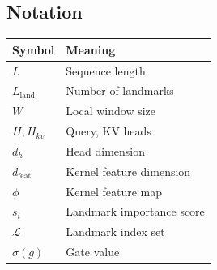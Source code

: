 \subsection{Notation}

\begin{table}[H]
\centering
\small
\begin{tabular}{ll}
\toprule
\textbf{Symbol} & \textbf{Meaning} \\
\midrule
$L$ & Sequence length \\
$L_\text{land}$ & Number of landmarks \\
$W$ & Local window size \\
$H, H_{kv}$ & Query, KV heads \\
$d_h$ & Head dimension \\
$d_\text{feat}$ & Kernel feature dimension \\
$\phi$ & Kernel feature map \\
$s_i$ & Landmark importance score \\
$\mathcal{L}$ & Landmark index set \\
$\sigma(g)$ & Gate value \\
\bottomrule
\end{tabular}
\end{table}

